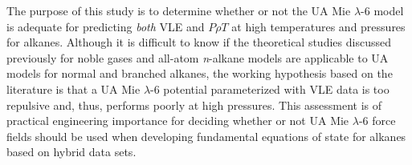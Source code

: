 \documentclass[preprint,letterpaper,floatfix,citeautoscript,aip,jcp]{revtex4-1}
\begin{document}





The purpose of this study is to determine whether or not the UA Mie $\lambda$-6 model is adequate for predicting \textit{both} VLE and 
$P \rho T$ at high temperatures and pressures for alkanes. Although it is difficult to know if the theoretical studies discussed previously for noble gases and all-atom \textit{n}-alkane models are applicable to UA models for normal and branched alkanes, the working hypothesis based on the literature is that a UA Mie $\lambda$-6 potential parameterized with VLE data is too repulsive and, thus, performs poorly at high pressures. 
This assessment is of practical engineering importance for deciding whether or not UA Mie $\lambda$-6 force fields should be used when developing fundamental equations of state for alkanes based on hybrid data sets.




%
%
\end{document}
